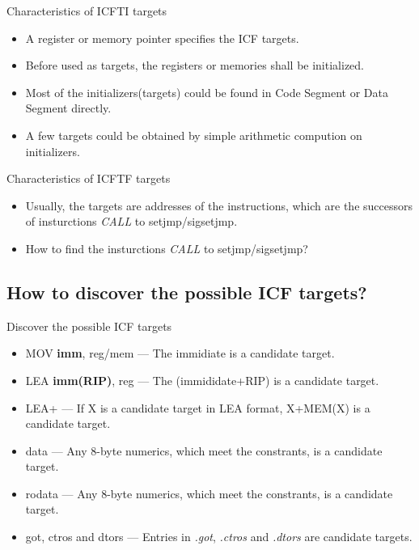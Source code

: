 \documentclass{beamer}
\begin{document}
\begin{frame}{Characteristics of ICFTI targets}
    \begin{itemize}
        \item
            A \alert{register} or \alert{memory} pointer specifies the ICF
            targets.
            \pause
        \item
            Before used as targets, the registers or memories shall be
            initialized.
            \pause
        \item
            Most of the initializers(targets) could be found in \alert{Code Segment} or
            \alert{Data Segment} directly.
            \pause
        \item
            A few targets could be obtained by simple arithmetic compution on
            initializers.
    \end{itemize}
\end{frame}

\begin{frame}{Characteristics of ICFTF targets}
    \begin{itemize}
        \item
            Usually, the targets are addresses of the instructions, which are
            the successors of insturctions \emph{CALL} to setjmp/sigsetjmp.
            \pause
        \item
            How to find the insturctions \emph{CALL} to setjmp/sigsetjmp?
    \end{itemize}
\end{frame}

\subsection{How to discover the possible ICF targets?}

\begin{frame}{Discover the possible ICF targets}
    \begin{itemize}
        \item MOV \textbf{imm}, reg/mem
            --- The immidiate is a candidate target.
            \pause
        \item LEA \textbf{imm(RIP)}, reg
            --- The (immididate+RIP) is a candidate target.
            \pause
        \item LEA+
            --- If X is a candidate target in LEA format, X+MEM(X) is a candidate target.
            \pause
        \item data
            --- Any 8-byte numerics, which meet the constrants, is a candidate target.
        \item rodata
            --- Any 8-byte numerics, which meet the constrants, is a candidate target.
            \pause
        \item got, ctros and dtors
            --- Entries in \emph{.got}, \emph{.ctros} and \emph{.dtors} are candidate targets.
    \end{itemize}
    
\end{frame}
\end{document}
